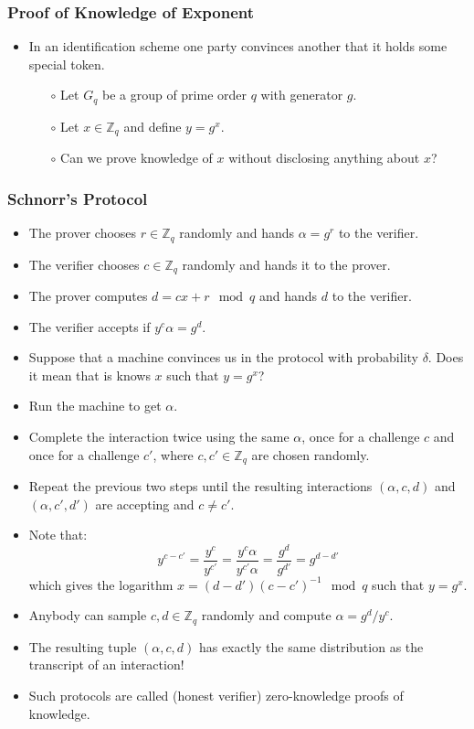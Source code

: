 \documentclass[a4paper]{scrartcl}
\begin{document}
\subsubsection*{Proof of Knowledge of Exponent}

\begin{itemize}
\item In an identification scheme one party convinces another that it holds some special token.
\begin{itemize}
\item [$\circ$] Let $G_q$ be a group of prime order $q$ with generator $g$.
\item [$\circ$] Let $x \in \mathbb{Z}_q$ and define $y = g^x$.
\item [$\circ$] Can we prove knowledge of $x$ without disclosing anything about $x$?
\end{itemize}
\end{itemize}

\subsubsection*{Schnorr's Protocol}

\begin{itemize}
\item The prover chooses $r \in \mathbb{Z}_q$ randomly and hands $\alpha = g^r$ to the verifier.
\item The verifier chooses $c \in \mathbb{Z}_q$ randomly and hands it to the prover.
\item The prover computes $d = cx + r \mod q$ and hands $d$ to the verifier.
\item The verifier accepts if $y^c\alpha = g^d$.
\item Suppose that a machine convinces us in the protocol with probability $\delta$. Does it mean that is knows $x$ such that $y = g^x$?
\item Run the machine to get $\alpha$.
\item Complete the interaction twice using the same $\alpha$, once for a challenge $c$ and once for a challenge $c'$, where $c,c' \in \mathbb{Z}_q$ are chosen randomly.
\item Repeat the previous two steps until the resulting interactions $(\alpha, c, d)$ and $(\alpha, c', d')$ are accepting and $c \neq c'$.
\item Note that:
$$y^{c-c'} = \frac{y^c}{y^{c'}} = \frac{y^c\alpha}{y^{c'}\alpha} = \frac{g^d}{g^{d'}} = g^{d-d'}$$ which gives the logarithm $x = (d-d')(c-c')^{-1} \mod q$ such that $y = g^x$.
\item Anybody can sample $c,d \in \mathbb{Z}_q$ randomly and compute $\alpha = g^d / y^c$.
\item The resulting tuple $(\alpha, c, d)$ has exactly the same distribution as the transcript of an interaction!
\item Such protocols are called (honest verifier) zero-knowledge proofs of knowledge.
\end{itemize}
\end{document}
